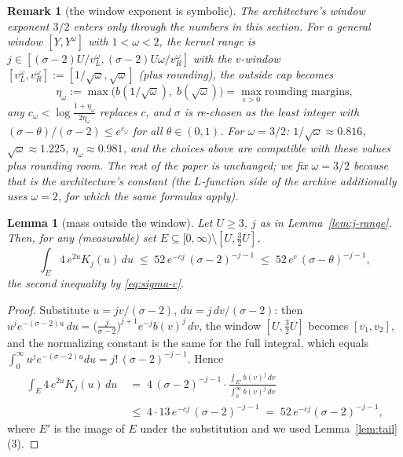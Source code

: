 \documentclass[11pt]{amsart}
\newtheorem{lemma}[theorem]{Lemma}
\newtheorem{remark}[theorem]{Remark}
\numberwithin{equation}{section}
\newcommand{\Sig}{\sigma}
\begin{document}
\begin{remark}[the window exponent is symbolic]\label{rem:exponent}
The architecture's window exponent $3/2$ enters only through the
numbers in this section. For a general window $[Y, Y^{\omega}]$
with $1 < \omega < 2$, the kernel range is $j \in
[(\Sig-2)U/v_L^{\omega}, (\Sig-2)U\omega/v_R^{\omega}]$ with the
$v$-window $[v_L^{\omega}, v_R^{\omega}] := [1/\sqrt{\omega},
\sqrt{\omega}]$ (plus rounding), the outside cap becomes
\[
\eta_{\omega} := \max\bigl(b(1/\sqrt{\omega}),\; b(\sqrt{\omega})\bigr)
= \max_{\epsilon > 0} \text{rounding margins},
\]
any $c_{\omega} < \log\frac{1+\eta_{\omega}}{2\eta_{\omega}}$ replaces
$c$, and $\Sig$ is re-chosen as the least integer with
$(\Sig-\theta)/(\Sig-2) \le e^{c_{\omega}}$ for all $\theta \in (0,1)$.
For $\omega = 3/2$: $1/\sqrt{\omega} \approx 0.816$,
$\sqrt{\omega} \approx 1.225$, $\eta_{\omega} \approx 0.981$, and the
choices above are compatible with these values plus rounding room. The
rest of the paper is unchanged; we fix $\omega = 3/2$ because that is
the architecture's constant (the $L$-function side of the archive
additionally uses $\omega = 2$, for which the same formulas apply).
\end{remark}

\begin{lemma}[mass outside the window]\label{lem:tail2}
Let $U \ge 3$, $j$ as in Lemma~\ref{lem:j-range}. Then, for any
(measurable) set $E \subseteq [0,\infty) \setminus [U,
\tfrac32 U]$,
\[
\int_E 4\,e^{2u} K_j(u)\,du \;\le\; 52\, e^{-cj}\,(\Sig-2)^{-j-1}
\;\le\; 52\, e^{c}\,(\Sig-\theta)^{-j-1},
\]
the second inequality by \eqref{eq:sigma-c}.
\end{lemma}

\begin{proof}
Substitute $u = jv/(\Sig-2)$, $du = j\,dv/(\Sig-2)$: then
$u^j e^{-(\Sig-2)u}\,du = \bigl(\tfrac{j}{\Sig-2}\bigr)^{j+1} e^{-j}
b(v)^j\,dv$, the window $[U, \tfrac32 U]$ becomes $[v_1, v_2]$, and the
normalizing constant is the same for the full integral, which equals
$\int_0^\infty u^j e^{-(\Sig-2)u}du = j!\,(\Sig-2)^{-j-1}$. Hence
\[
\begin{split}
\int_E 4\,e^{2u}K_j(u)\,du
\;&=\; 4\,(\Sig-2)^{-j-1}\cdot
  \frac{\int_{E'} b(v)^j\,dv}{\int_0^\infty b(v)^j\,dv}\\
\;&\le\; 4 \cdot 13\,e^{-cj}\,(\Sig-2)^{-j-1}
\;=\; 52\,e^{-cj}(\Sig-2)^{-j-1},
\end{split}
\]
where $E'$ is the image of $E$ under the substitution and we used
Lemma~\ref{lem:tail}(3).
\end{proof}
\end{document}

